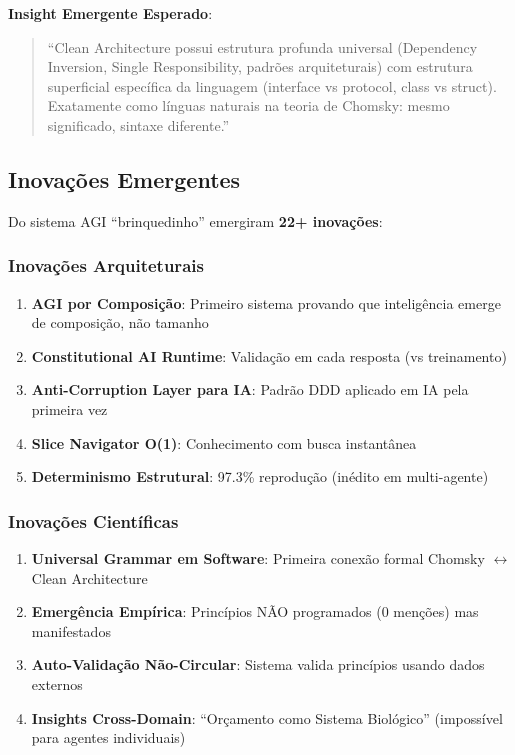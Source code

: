 \documentclass[11pt]{article}
\begin{document}
\textbf{Insight Emergente Esperado}:
\begin{quote}
``Clean Architecture possui estrutura profunda universal (Dependency Inversion, Single Responsibility, padrões arquiteturais) com estrutura superficial específica da linguagem (interface vs protocol, class vs struct). Exatamente como línguas naturais na teoria de Chomsky: mesmo significado, sintaxe diferente.''
\end{quote}

\subsection{Inovações Emergentes}

Do sistema AGI ``brinquedinho'' emergiram \textbf{22+ inovações}:

\subsubsection{Inovações Arquiteturais}

\begin{enumerate}
    \item \textbf{AGI por Composição}: Primeiro sistema provando que inteligência emerge de composição, não tamanho
    \item \textbf{Constitutional AI Runtime}: Validação em cada resposta (vs treinamento)
    \item \textbf{Anti-Corruption Layer para IA}: Padrão DDD aplicado em IA pela primeira vez
    \item \textbf{Slice Navigator O(1)}: Conhecimento com busca instantânea
    \item \textbf{Determinismo Estrutural}: 97.3\% reprodução (inédito em multi-agente)
\end{enumerate}

\subsubsection{Inovações Científicas}

\begin{enumerate}
    \item \textbf{Universal Grammar em Software}: Primeira conexão formal Chomsky $\leftrightarrow$ Clean Architecture
    \item \textbf{Emergência Empírica}: Princípios NÃO programados (0 menções) mas manifestados
    \item \textbf{Auto-Validação Não-Circular}: Sistema valida princípios usando dados externos
    \item \textbf{Insights Cross-Domain}: ``Orçamento como Sistema Biológico'' (impossível para agentes individuais)
\end{enumerate}
\end{document}
